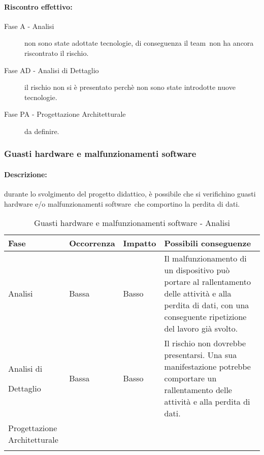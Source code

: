 \documentclass[../PianoProgetto.tex]{subfiles}
\begin{document}
	\paragraph*{Riscontro effettivo:} 
		\begin{description}
			\item[Fase A - Analisi] non sono state adottate tecnologie, di conseguenza il team\g\ non ha ancora riscontrato il rischio.
			\item[Fase AD - Analisi di Dettaglio] il rischio non si è presentato perchè non sono state introdotte nuove tecnologie.
			\item[Fase PA - Progettazione Architetturale] da definire.
		\end{description}


	\subsubsection{Guasti hardware e malfunzionamenti software}
	\label{sec:Guasti hardware e malfunzionamenti software}
	
	\paragraph*{Descrizione:} durante lo svolgimento del progetto didattico, è possibile che si verifichino guasti hardware e/o malfunzionamenti software\g\ che comportino la perdita di dati.
	
	
	\begin{table}[h]
		\centering
		\begin{tabularx}{\textwidth}{F O O P}
			\toprule
			\textbf{Fase} & \textbf{Occorrenza} & \textbf{Impatto} & \textbf{Possibili conseguenze}\\
			\midrule
			Analisi & Bassa & Basso & Il malfunzionamento di un dispositivo può portare al rallentamento delle attività e alla perdita di dati, con una conseguente ripetizione del lavoro già svolto. \\
			\midrule
			Analisi di \par Dettaglio & Bassa & Basso & Il rischio non dovrebbe presentarsi. Una sua manifestazione potrebbe comportare un rallentamento delle attività e alla perdita di dati. \\
			\midrule
			Progettazione Architetturale & & & \\
			\bottomrule
		\end{tabularx}
		\caption{Guasti hardware e malfunzionamenti software - Analisi}
		\label{tab:Guasti hardware e malfunzionamenti software - Analisi}	
	\end{table} 
		
\end{document}
